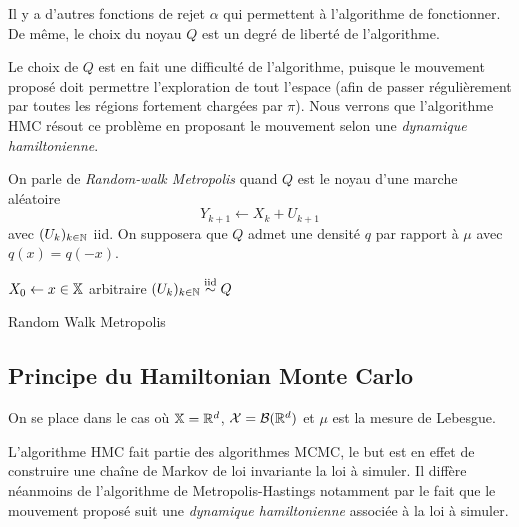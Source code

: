 \documentclass[10pt,a4paper]{article}
\begin{document}
\begin{Rque}
	Il y a d'autres fonctions de rejet $\alpha$ qui permettent à l'algorithme de fonctionner. De même, le choix du noyau $Q$ est un degré de liberté de l'algorithme.

	Le choix de $Q$ est en fait une difficulté de l'algorithme, puisque le mouvement proposé doit permettre l'exploration de tout l'espace (afin de passer régulièrement par toutes les régions fortement chargées par $\pi$). Nous verrons que l'algorithme HMC résout ce problème en proposant le mouvement selon une \emph{dynamique hamiltonienne}.
\end{Rque}

\begin{Def}
	On parle de \emph{Random-walk Metropolis} quand $Q$ est le noyau d'une marche aléatoire
	$$Y_{k+1} \leftarrow X_k + U_{k+1}$$
	avec $(U_k)_{k \in \mathbb{N}}$ iid. On supposera que $Q$ admet une densité $q$ par rapport à $\mu$ avec $q(x) = q(-x)$.
\end{Def}

\begin{center}
	\begin{algorithm}[H]
		$X_0 \leftarrow x \in \mathbb{X}$ arbitraire\;
		$(U_k)_{k \in \mathbb{N}} \stackrel{\rm iid}{\sim} Q$ \;
		\caption{Random Walk Metropolis}
		\label{algo:metropolis}
	\end{algorithm}
\end{center}

\subsection{Principe du Hamiltonian Monte Carlo}

On se place dans le cas où $\mathbb{X} = \mathbb{R}^d$, $\mathcal{X} = \mathcal{B}(\mathbb{R}^d)$ et $\mu$ est la mesure de Lebesgue. 

L'algorithme HMC fait partie des algorithmes MCMC, le but est en effet de construire une chaîne de Markov de loi invariante la loi à simuler. Il diffère néanmoins de l'algorithme de Metropolis-Hastings notamment par le fait que le mouvement proposé suit une \emph{dynamique hamiltonienne} associée à la loi à simuler.
\end{document}
